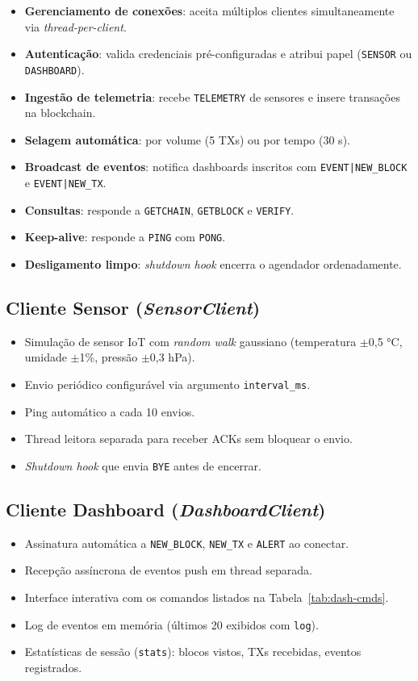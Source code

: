 \documentclass[12pt, a4paper]{article}
\begin{document}
\begin{itemize}
  \item \textbf{Gerenciamento de conexões}: aceita múltiplos clientes simultaneamente via \emph{thread-per-client}.
  \item \textbf{Autenticação}: valida credenciais pré-configuradas e atribui papel (\texttt{SENSOR} ou \texttt{DASHBOARD}).
  \item \textbf{Ingestão de telemetria}: recebe \texttt{TELEMETRY} de sensores e insere transações na blockchain.
  \item \textbf{Selagem automática}: por volume (5 TXs) ou por tempo (30 s).
  \item \textbf{Broadcast de eventos}: notifica dashboards inscritos com \texttt{EVENT|NEW\_BLOCK} e \texttt{EVENT|NEW\_TX}.
  \item \textbf{Consultas}: responde a \texttt{GETCHAIN}, \texttt{GETBLOCK} e \texttt{VERIFY}.
  \item \textbf{Keep-alive}: responde a \texttt{PING} com \texttt{PONG}.
  \item \textbf{Desligamento limpo}: \emph{shutdown hook} encerra o agendador ordenadamente.
\end{itemize}

\subsection{Cliente Sensor (\textit{SensorClient})}

\begin{itemize}
  \item Simulação de sensor IoT com \emph{random walk} gaussiano (temperatura $\pm$0,5 °C, umidade $\pm$1\%, pressão $\pm$0,3 hPa).
  \item Envio periódico configurável via argumento \texttt{interval\_ms}.
  \item Ping automático a cada 10 envios.
  \item Thread leitora separada para receber ACKs sem bloquear o envio.
  \item \emph{Shutdown hook} que envia \texttt{BYE} antes de encerrar.
\end{itemize}

\subsection{Cliente Dashboard (\textit{DashboardClient})}

\begin{itemize}
  \item Assinatura automática a \texttt{NEW\_BLOCK}, \texttt{NEW\_TX} e \texttt{ALERT} ao conectar.
  \item Recepção assíncrona de eventos push em thread separada.
  \item Interface interativa com os comandos listados na Tabela~\ref{tab:dash-cmds}.
  \item Log de eventos em memória (últimos 20 exibidos com \texttt{log}).
  \item Estatísticas de sessão (\texttt{stats}): blocos vistos, TXs recebidas, eventos registrados.
\end{itemize}
\end{document}
